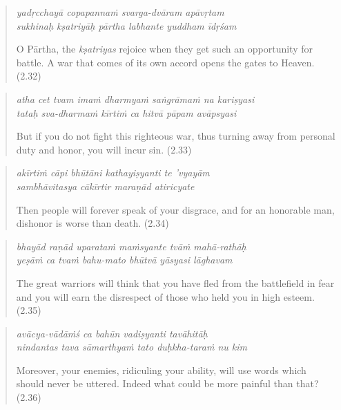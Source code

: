 \documentclass[12pt, twoside, openright]{memoir}
\begin{document}
\par
\begin{verse}
\textit{yadṛcchayā copapannaṁ svarga-dvāram apāvṛtam} \\
\textit{sukhinaḥ kṣatriyāḥ pārtha labhante yuddham īdṛśam}

\noindent O Pārtha, the \textit{kṣatriyas} rejoice when they get such an opportunity for battle. A war that comes of its own accord opens the gates to Heaven. (2.32)
\end{verse}
\par



\par
\begin{verse}
\textit{atha cet tvam imaṁ dharmyaṁ saṅgrāmaṁ na kariṣyasi} \\
\textit{tataḥ sva-dharmaṁ kīrtiṁ ca hitvā pāpam avāpsyasi}

\noindent But if you do not fight this righteous war, thus turning away from personal duty and honor, you will incur sin. (2.33)
\end{verse}
\par



\par
\begin{verse}
\textit{akīrtiṁ cāpi bhūtāni kathayiṣyanti te ’vyayām} \\
\textit{sambhāvitasya cākīrtir maraṇād atiricyate}

\noindent Then people will forever speak of your disgrace, and for an honorable man, dishonor is worse than death. (2.34)
\end{verse}
\par



\par
\begin{verse}
\textit{bhayād raṇād uparataṁ maṁsyante tvāṁ mahā-rathāḥ} \\
\textit{yeṣāṁ ca tvaṁ bahu-mato bhūtvā yāsyasi lāghavam}

\noindent The great warriors will think that you have fled from the battlefield in fear and you will earn the disrespect of those who held you in high esteem. (2.35)
\end{verse}
\par



\par
\begin{verse}
\textit{avācya-vādāṁś ca bahūn vadiṣyanti tavāhitāḥ} \\
\textit{nindantas tava sāmarthyaṁ tato duḥkha-taraṁ nu kim}

\noindent Moreover, your enemies, ridiculing your ability, will use words which should never be uttered. Indeed what could be more painful than that? (2.36)
\end{verse}
\par
\end{document}
